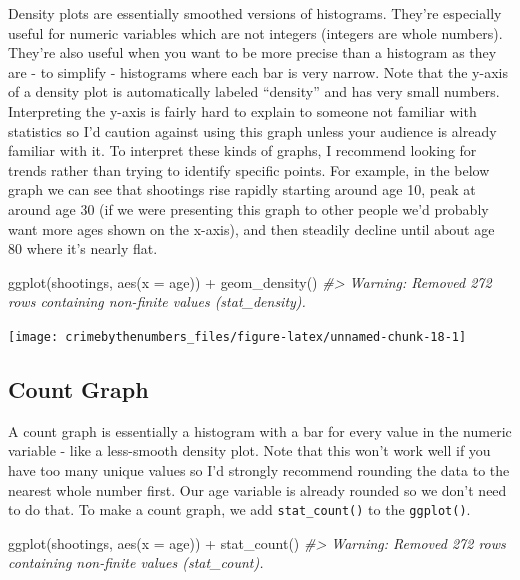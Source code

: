 \documentclass[
  12pt,
]{book}
\newenvironment{Shaded}{\begin{snugshade}}{\end{snugshade}}
\newcommand{\AttributeTok}[1]{\textcolor[rgb]{0.61,0.61,0.61}{#1}}
\newcommand{\CommentTok}[1]{\textcolor[rgb]{0.37,0.37,0.37}{\textit{#1}}}
\newcommand{\FunctionTok}[1]{\textcolor[rgb]{0,0,0}{#1}}
\newcommand{\NormalTok}[1]{#1}
\newcommand{\SpecialCharTok}[1]{\textcolor[rgb]{0,0,0}{#1}}
\begin{document}
Density plots are essentially smoothed versions of histograms. They're especially useful for numeric variables which are not integers (integers are whole numbers). They're also useful when you want to be more precise than a histogram as they are - to simplify - histograms where each bar is very narrow. Note that the y-axis of a density plot is automatically labeled ``density'' and has very small numbers. Interpreting the y-axis is fairly hard to explain to someone not familiar with statistics so I'd caution against using this graph unless your audience is already familiar with it. To interpret these kinds of graphs, I recommend looking for trends rather than trying to identify specific points. For example, in the below graph we can see that shootings rise rapidly starting around age 10, peak at around age 30 (if we were presenting this graph to other people we'd probably want more ages shown on the x-axis), and then steadily decline until about age 80 where it's nearly flat.

\begin{Shaded}
\begin{Highlighting}[]
\FunctionTok{ggplot}\NormalTok{(shootings, }\FunctionTok{aes}\NormalTok{(}\AttributeTok{x =}\NormalTok{ age)) }\SpecialCharTok{+} 
  \FunctionTok{geom\_density}\NormalTok{()}
\CommentTok{\#\textgreater{} Warning: Removed 272 rows containing non{-}finite values (stat\_density).}
\end{Highlighting}
\end{Shaded}

\begin{center}\texttt{[image: crimebythenumbers\_files/figure-latex/unnamed-chunk-18-1]} \end{center}

\hypertarget{count-graph}{%
\subsection{Count Graph}\label{count-graph}}

A count graph is essentially a histogram with a bar for every value in the numeric variable - like a less-smooth density plot. Note that this won't work well if you have too many unique values so I'd strongly recommend rounding the data to the nearest whole number first. Our age variable is already rounded so we don't need to do that. To make a count graph, we add \texttt{stat\_count()} to the \texttt{ggplot()}.

\begin{Shaded}
\begin{Highlighting}[]
\FunctionTok{ggplot}\NormalTok{(shootings, }\FunctionTok{aes}\NormalTok{(}\AttributeTok{x =}\NormalTok{ age)) }\SpecialCharTok{+} 
  \FunctionTok{stat\_count}\NormalTok{()}
\CommentTok{\#\textgreater{} Warning: Removed 272 rows containing non{-}finite values (stat\_count).}
\end{Highlighting}
\end{Shaded}
\end{document}
